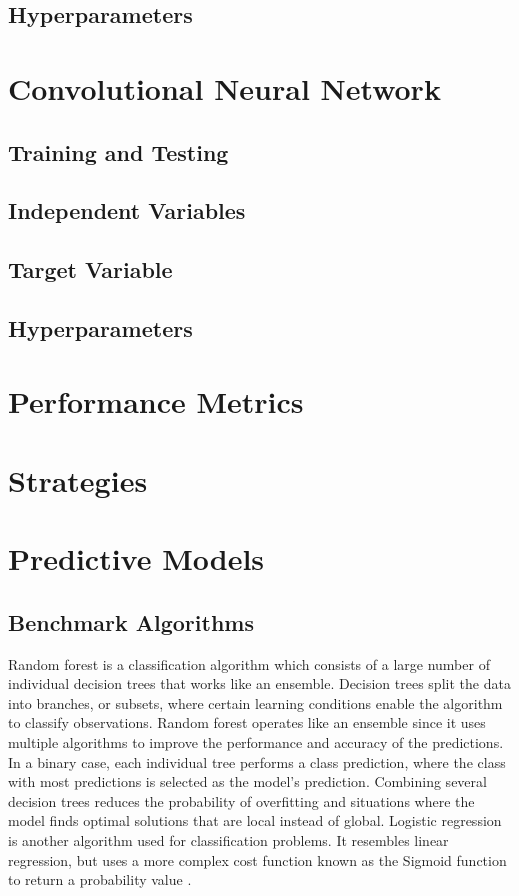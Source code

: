 \subsection{Hyperparameters}

\section{Convolutional Neural Network}

\subsection{Training and Testing}

\subsection{Independent Variables}

\subsection{Target Variable}

\subsection{Hyperparameters}

\section{Performance Metrics}

\section{Strategies}

\section{Predictive Models }
\subsection{ Benchmark Algorithms}
Random forest is a classification algorithm which consists of a large number of individual decision trees that works like an ensemble. Decision trees split the data into branches, or subsets, where certain learning conditions enable the algorithm to classify observations. Random forest operates like an ensemble since it uses multiple algorithms to improve the performance and accuracy of the predictions. In a binary case, each individual tree performs a class prediction, where the class with most predictions is selected as the model's prediction. Combining several decision trees reduces the probability of overfitting and situations where the model finds optimal solutions that are local instead of global. Logistic regression is another algorithm used for classification problems. It resembles linear regression, but uses a more complex cost function known as the Sigmoid function to return a probability value \cite{pant}. 

